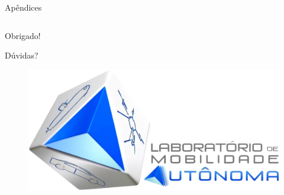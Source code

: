 \documentclass{if-beamer}
\begin{document}
\begin{frame}{Apêndices}
\begin{columns}
\begin{column}{0.5\textwidth}
			
			
		\end{column}
		
	\end{columns}
	
\end{frame}


\begin{frame}{}
	
	\begin{block}{}
		
		\centering
		\Huge{Obrigado!}
		
		\LARGE
		
		\vspace{5mm}
		
		Dúvidas?
		
	\end{block}
	
	\vspace{4mm}
	
	\begin{figure}[H]
		\centering
		\includegraphics[width=0.5\linewidth]{img/core/Logo_LMA.png}
	\end{figure}
	
\end{frame}
\end{document}
